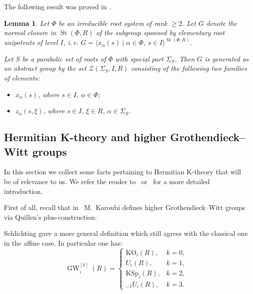 \documentclass[oneside, 10pt]{amsart}
\newtheorem{lemma}{Lemma}
\theoremstyle{remark}
\theoremstyle{definition}
\DeclareMathOperator{\St}{St}
\DeclareMathOperator{\GW}{GW}
\numberwithin{equation}{section}
\begin{document}
The following result was proved in \cite[Proposition~3.2]{Ste13}.
\begin{lemma}\label{lem:Zgen} Let $\Phi$ be an irreducible root system of rank $\geq 2$. 
Let $G$ denote the normal closure in $\St(\Phi, R)$ of the subgroup spanned by elementary root unipotents of level $I$, i.\,e. $G=\langle x_\alpha(s) \mid \alpha\in\Phi,\ s\in I\rangle^{\St(\Phi, R)}$.

Let $S$ be a parabolic set of roots of $\Phi$ with special part $\Sigma_S$. Then $G$ is generated as an abstract group by the set $\mathcal{Z}(\Sigma_S, I, R)$ consisting of the following two families of elements:
\begin{itemize}
 \item $x_{\alpha}(s)$, where $s\in I$, $\alpha\in\Phi$;
 \item $z_\alpha(s,\xi)$, where $s\in I$, $\xi\in R$, $\alpha\in\Sigma_S$.
\end{itemize}        
\end{lemma}

\begin{comment}
Suppose for a moment that $\langle \alpha, \beta \rangle = -1$ and  $\langle \beta, \alpha \rangle = -1$ then
\[ \{s, t^{-1} \} = \{s,  t^{-1}\}_\alpha = \{t, s^{-1} \}_\beta^{-1} = \{s^{-1}, t\} \]
In particular, $\{s, s^{-1}\} = \{s, s^{-1}\}^{-1}$ 
\end{comment}

\subsection{Hermitian K-theory and higher Grothendieck--Witt groups}
In this section we collect some facts pertaining to Hermitian K-theory that will be of relevance to us. We refer the reader to~\cite[\S~2]{AF17} or~\cite[\S~2]{FRS12} for a more detailed introduction.

First of all, recall that in~\cite{Ka80} M.~Karoubi defines higher Grothendieck--Witt groups via Quillen's plus-construction:

Schlichting gave a more general definition which still agrees with the classical one in the affine case.
In particular one has:
\begin{equation}
 \GW_i^{[k]}(R) = \left\{\begin{array}{ll} \mathrm{KO}_i(R), & k = 0, \\ U_i(R), & k = 1, \\ \mathrm{KSp}_i(R), & k = 2, \\ {}_{-1}\!U_i(R), & k = 3. \end{array}\right.
\end{equation}
\end{document}
